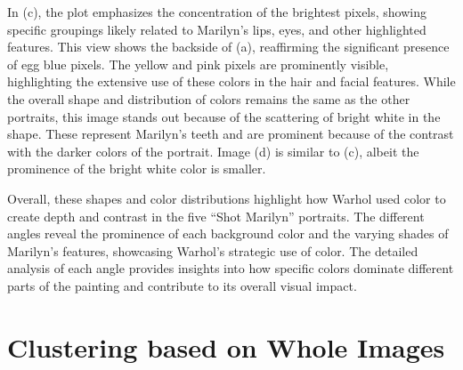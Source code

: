 \documentclass{article}
\begin{document}
In (c), the plot emphasizes the concentration of the brightest pixels,
showing specific groupings likely related to Marilyn's lips, eyes, and
other highlighted features. This view shows the backside of (a),
reaffirming the significant presence of egg blue pixels. The yellow and
pink pixels are prominently visible, highlighting the extensive use of
these colors in the hair and facial features. While the overall shape
and distribution of colors remains the same as the other portraits, this
image stands out because of the scattering of bright white in the shape.
These represent Marilyn's teeth and are prominent because of the
contrast with the darker colors of the portrait. Image (d) is similar to
(c), albeit the prominence of the bright white color is smaller.

Overall, these shapes and color distributions highlight how Warhol used
color to create depth and contrast in the five ``Shot Marilyn''
portraits. The different angles reveal the prominence of each background
color and the varying shades of Marilyn's features, showcasing Warhol's
strategic use of color. The detailed analysis of each angle provides
insights into how specific colors dominate different parts of the
painting and contribute to its overall visual impact.

\hypertarget{clustering-based-on-whole-images}{%
\section{Clustering based on Whole
Images}\label{clustering-based-on-whole-images}}
\end{document}
